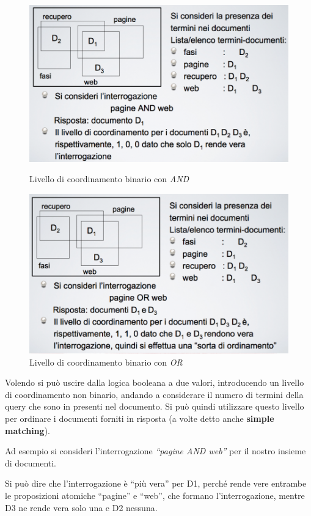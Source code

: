 \begin{figure}[ht]
	\centering
	\begin{minipage}[b]{0.45\linewidth}
		\centering
		\includegraphics[width=0.7\linewidth]{images/l8-set-1}
		\caption{Livello di coordinamento binario con \textit{AND}}
		
	\end{minipage}
	\quad
	\begin{minipage}[b]{0.45\linewidth}
		\centering
		\includegraphics[width=0.7\linewidth]{images/l8-set-2}
		\caption{Livello di coordinamento binario con \textit{OR}}
	\end{minipage}
\end{figure}

Volendo si può uscire dalla logica booleana a due valori, introducendo un livello di coordinamento non binario, andando a considerare il numero di termini della query che sono in presenti nel documento.
Si può quindi utilizzare questo livello per ordinare i documenti forniti in risposta (a volte detto anche \textbf{simple matching}).

Ad esempio si consideri l'interrogazione \textit{``pagine AND web''} per il nostro insieme di documenti.

Si può dire che l'interrogazione è ``più vera'' per D1, perché rende vere entrambe le proposizioni atomiche ``pagine'' e ``web'', che formano l'interrogazione, mentre D3 ne rende vera solo una e D2 nessuna.

